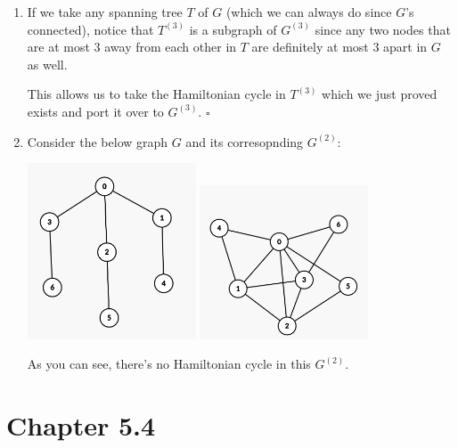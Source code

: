 \documentclass[12pt]{article}
\begin{document}
\begin{enumerate}
\begin{enumerate}
            \item If we take any spanning tree $T$ of $G$ (which we can always do since $G$'s connected),
                  notice that $T^{(3)}$ is a subgraph of $G^{(3)}$ since any two nodes
                  that are at most $3$ away from each other in $T$ are definitely
                  at most $3$ apart in $G$ as well.

                  This allows us to take the Hamiltonian cycle in $T^{(3)}$
                  which we just proved exists and port it over to $G^{(3)}$. $\square$

            \item Consider the below graph $G$ and its corresopnding $G^{(2)}$:
                  \begin{center}
                      \hfill
                      \includegraphics[width=5cm]{img/hw4/no_cycle}
                      \hfill
                      \includegraphics[width=5cm]{img/hw4/still_no_cycle}
                      \hfill \mbox{}
                  \end{center}
                  As you can see, there's no Hamiltonian cycle in this $G^{(2)}$.
        \end{enumerate}
\end{enumerate}

\pagebreak

\section{Chapter 5.4}
\end{document}
